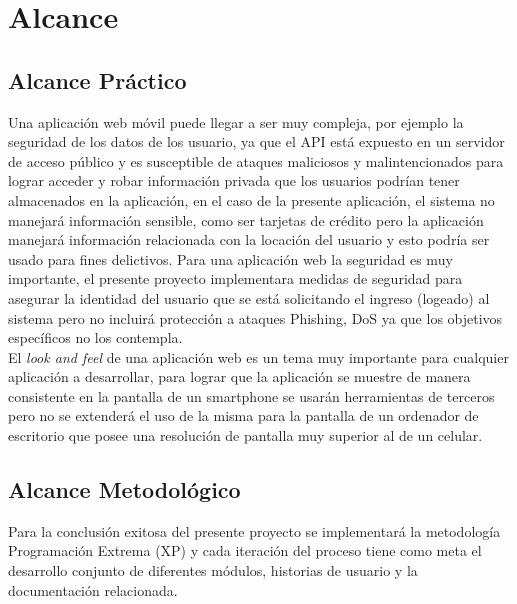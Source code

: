   \section{Alcance}
  \label{sec:Alcance}

    \subsection{Alcance Práctico}
    \label{sub:alcance_practico}
    Una aplicación web móvil puede llegar a ser muy compleja, por ejemplo la seguridad de los datos de los usuario, ya que el API está expuesto en un servidor de acceso público y es susceptible de ataques maliciosos y malintencionados para lograr acceder y robar información privada que los usuarios podrían tener almacenados en la aplicación, en el caso de la presente aplicación, el sistema no manejará información sensible, como ser tarjetas de crédito pero la aplicación manejará información relacionada con la locación del usuario y esto podría ser usado para fines delictivos. Para una aplicación web la seguridad es muy importante, el presente proyecto implementara medidas de seguridad para asegurar la identidad del usuario que se está solicitando el ingreso (logeado) al sistema pero no incluirá protección a ataques Phishing, DoS ya que los objetivos específicos no los contempla.\\


    El \emph{look and feel} de una aplicación web es un tema muy importante para cualquier aplicación a desarrollar, para lograr que la aplicación se muestre de manera consistente en la pantalla de un smartphone se usarán herramientas de terceros pero no se extenderá el uso de la misma para la pantalla de un ordenador de escritorio que posee una resolución de pantalla muy superior al de un celular.\\




    \subsection{Alcance Metodológico}
    \label{sub:alcance_metodologico}
    Para la conclusión exitosa del presente proyecto se implementará la metodología  Programación Extrema (XP) y cada iteración del proceso tiene como meta el desarrollo conjunto de diferentes módulos, historias de usuario y la documentación relacionada.

